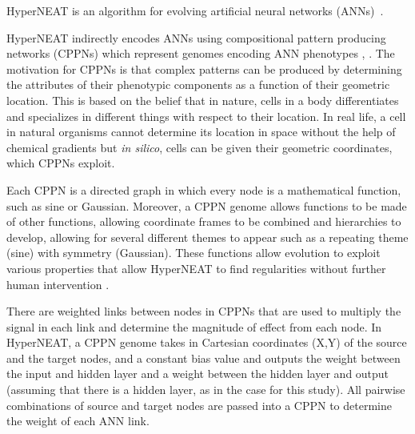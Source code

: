 HyperNEAT is an algorithm for evolving artificial neural networks (ANNs)~\cite{stanley3}. 

HyperNEAT indirectly encodes ANNs using compositional pattern producing networks (CPPNs) which represent genomes encoding ANN phenotypes \cite{stanley1}, \cite{stanley2}. 
The motivation for CPPNs is that complex patterns can be produced by determining the attributes of their phenotypic components as a function of their geometric location. 
This is based on the belief that in nature, cells in a body differentiates and specializes in different things with respect to their location. 
In real life, a cell in natural organisms cannot determine its location in space without the help of chemical gradients but \emph{in silico}, cells can be given their geometric coordinates, which CPPNs exploit. 


Each CPPN is a directed graph in which every node is a mathematical function, such as sine or Gaussian. 
Moreover, a CPPN genome allows functions to be made of other functions, allowing coordinate frames to be combined and hierarchies to develop, allowing for several different themes to appear such as a repeating theme (sine) with symmetry (Gaussian). 
These functions allow evolution to exploit various properties that allow HyperNEAT to find regularities without further human intervention \cite{stanley1,clune1}. %


There are weighted links between nodes in CPPNs that are used to multiply the signal in each link and determine the magnitude of effect from each node. 
In HyperNEAT, a CPPN genome takes in Cartesian coordinates (X,Y) of the source and the target nodes, and a constant bias value and outputs the weight between the input and hidden layer and a weight between the hidden layer and output (assuming that there is a hidden layer, as in the case for this study). 
All pairwise combinations of source and target nodes are passed into a CPPN to determine the weight of each ANN link. 



